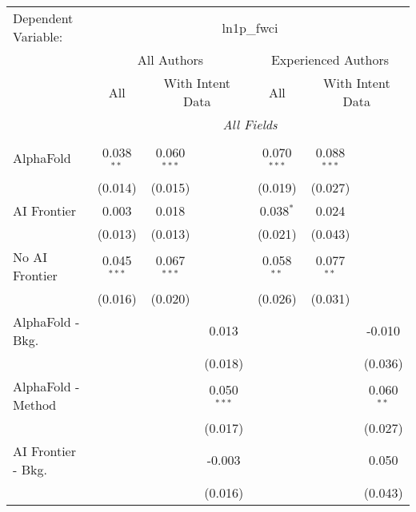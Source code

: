 \begingroup
\centering
\begin{tabular}{lcccccc}
   \tabularnewline \midrule \midrule
   Dependent Variable: & \multicolumn{6}{c}{ln1p\_fwci}\\
 & \multicolumn{3}{c}{All Authors} & \multicolumn{3}{c}{Experienced Authors} \\
\cmidrule(lr){2-4} \cmidrule(lr){5-7}
 & \multicolumn{1}{c}{All} & \multicolumn{2}{c}{With Intent Data} & \multicolumn{1}{c}{All} & \multicolumn{2}{c}{With Intent Data} \\
\cmidrule(lr){2-2} \cmidrule(lr){3-4} \cmidrule(lr){5-5} \cmidrule(lr){6-7}
 & \multicolumn{6}{c}{\textit{All Fields}} \\ \\
   AlphaFold               & 0.038$^{**}$  & 0.060$^{***}$ &               & 0.070$^{***}$ & 0.088$^{***}$ &   \\   
                           & (0.014)       & (0.015)       &               & (0.019)       & (0.027)       &   \\   
   AI Frontier             & 0.003         & 0.018         &               & 0.038$^{*}$   & 0.024         &   \\   
                           & (0.013)       & (0.013)       &               & (0.021)       & (0.043)       &   \\   
   No AI Frontier          & 0.045$^{***}$ & 0.067$^{***}$ &               & 0.058$^{**}$  & 0.077$^{**}$  &   \\   
                           & (0.016)       & (0.020)       &               & (0.026)       & (0.031)       &   \\   
   AlphaFold - Bkg.        &               &               & 0.013         &               &               & -0.010\\   
                           &               &               & (0.018)       &               &               & (0.036)\\   
   AlphaFold - Method      &               &               & 0.050$^{***}$ &               &               & 0.060$^{**}$\\   
                           &               &               & (0.017)       &               &               & (0.027)\\   
   AI Frontier - Bkg.      &               &               & -0.003        &               &               & 0.050\\   
                           &               &               & (0.016)       &               &               & (0.043)\\   

\end{tabular}
